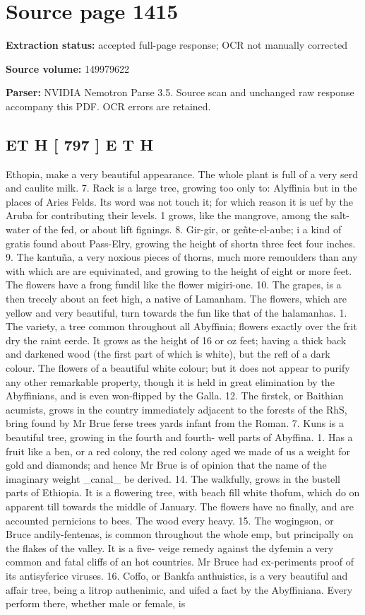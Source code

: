 \clearpage
\section{Source page 1415}
\textbf{Extraction status:} accepted full-page response; OCR not manually corrected\par
\textbf{Source volume:} 149979622\par
\textbf{Parser:} NVIDIA Nemotron Parse 3.5. Source scan and unchanged raw response accompany this PDF. OCR errors are retained.\par\medskip
\subsection*{ET H  [ 797 ] E T H}
Ethopia, make a very beautiful appearance. The whole plant is full of a very serd and caulite milk. 7. Rack is a large tree, growing too only to: Alyffinia but in the places of Aries Felds. Its word was not touch it; for which reason it is uef by the Aruba for contributing their levels. 1 grows, like the mangrove, among the salt-water of the fed, or about lift fignings. 8. Gir-gir, or geñte-el-aube; i a kind of gratis found about Pass-Elry, growing the height of shortn three feet four inches. 9. The kantuña, a very noxious pieces of thorns, much more remoulders than any with which are are equivinated, and growing to the height of eight or more feet. The flowers have a frong fundil like the flower migiri-one. 10. The grapes, is a then trecely about an feet high, a native of Lamanham. The flowers, which are yellow and very beautiful, turn towards the fun like that of the halamanhas. 1. The variety, a tree common throughout all Abyffinia; flowers exactly over the frit dry the raint eerde. It grows as the height of 16 or oz feet; having a thick back and darkened wood (the first part of which is white), but the refl of a dark colour. The flowers of a beautiful white colour; but it does not appear to purify any other remarkable property, though it is held in great elimination by the Abyffinians, and is even won-flipped by the Galla. 12. The firstek, or Baithian acumists, grows in the country immediately adjacent to the forests of the RhS, bring found by Mr Brue ferse trees yards infant from the Roman. 7. Kuns is a beautiful tree, growing in the fourth and fourth- well parts of Abyffina. 1. Has a fruit like a ben, or a red colony, the red colony aged we made of us a weight for gold and diamonds; and hence Mr Brue is of opinion that the name of the imaginary weight \_canal\_ be derived. 14. The walkfully, grows in the bustell parts of Ethiopia. It is a flowering tree, with beach fill white thofum, which do on apparent till towards the middle of January. The flowers have no finally, and are accounted pernicions to bees. The wood every heavy. 15. The wogingson, or Bruce andily-fentenas, is common throughout the whole emp, but principally on the flakes of the valley. It is a five- veige remedy against the dyfemin a very common and fatal cliffs of an hot countries. Mr Bruce had ex-periments proof of its antisyferice viruses. 16. Coffo, or Bankfa anthuistics, is a very beautiful and affair tree, being a litrop authenimic, and uifed a fact by the Abyffiniana. Every perform there, whether male or female, is 